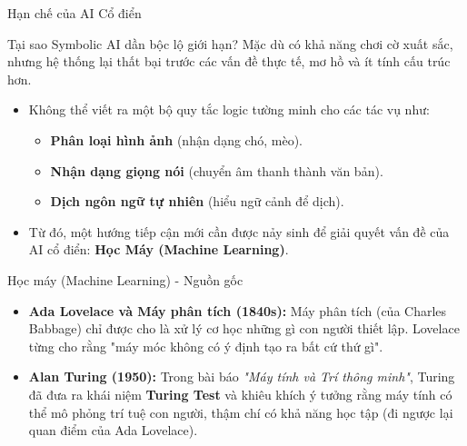 \documentclass[aspectratio=169]{beamer}
\begin{document}
\begin{frame}{Hạn chế của AI Cổ điển}
    \begin{block}{Tại sao Symbolic AI dần bộc lộ giới hạn?}
        Mặc dù có khả năng chơi cờ xuất sắc, nhưng hệ thống lại thất bại trước các vấn đề thực tế, mơ hồ và ít tính cấu trúc hơn.
    \end{block}
    \begin{itemize}
        \item Không thể viết ra một bộ quy tắc logic tường minh cho các tác vụ như:
        \begin{itemize}
            \item \textbf{Phân loại hình ảnh} (nhận dạng chó, mèo).
            \item \textbf{Nhận dạng giọng nói} (chuyển âm thanh thành văn bản).
            \item \textbf{Dịch ngôn ngữ tự nhiên} (hiểu ngữ cảnh để dịch).
        \end{itemize}
        \item Từ đó, một hướng tiếp cận mới cần được nảy sinh để giải quyết vấn đề của AI cổ điển: \textbf{Học Máy (Machine Learning)}.
    \end{itemize}
\end{frame}

\begin{frame}{Học máy (Machine Learning) - Nguồn gốc}
    \begin{itemize}
        \item \textbf{Ada Lovelace và Máy phân tích (1840s):} Máy phân tích (của Charles Babbage) chỉ được cho là xử lý cơ học những gì con người thiết lập. Lovelace từng cho rằng "máy móc không có ý định tạo ra bất cứ thứ gì".
        \item \textbf{Alan Turing (1950):} Trong bài báo \textit{"Máy tính và Trí thông minh"}, Turing đã đưa ra khái niệm \textbf{Turing Test} và khiêu khích ý tưởng rằng máy tính có thể mô phỏng trí tuệ con người, thậm chí có khả năng học tập (đi ngược lại quan điểm của Ada Lovelace).
    \end{itemize}
\end{frame}
\end{document}
